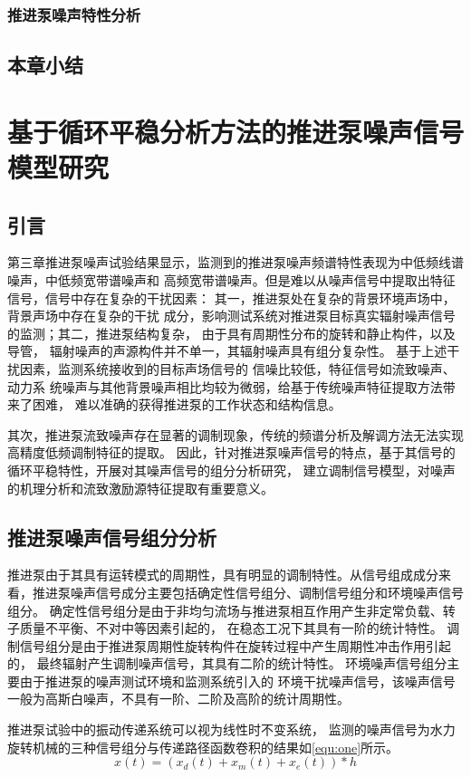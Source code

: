 \subsection{推进泵噪声特性分析}

\section{本章小结}
\chapter{基于循环平稳分析方法的推进泵噪声信号模型研究}
\section{引言}
第三章推进泵噪声试验结果显示，监测到的推进泵噪声频谱特性表现为中低频线谱噪声，中低频宽带谱噪声和
高频宽带谱噪声。但是难以从噪声信号中提取出特征信号，信号中存在复杂的干扰因素：
其一，推进泵处在复杂的背景环境声场中，背景声场中存在复杂的干扰
成分，影响测试系统对推进泵目标真实辐射噪声信号的监测；其二，推进泵结构复杂，
由于具有周期性分布的旋转和静止构件，以及导管，
辐射噪声的声源构件并不单一，其辐射噪声具有组分复杂性。
基于上述干扰因素，监测系统接收到的目标声场信号的
信噪比较低，特征信号如流致噪声、动力系
统噪声与其他背景噪声相比均较为微弱，给基于传统噪声特征提取方法带来了困难，
难以准确的获得推进泵的工作状态和结构信息。

其次，推进泵流致噪声存在显著的调制现象，传统的频谱分析及解调方法无法实现高精度低频调制特征的提取。
因此，针对推进泵噪声信号的特点，基于其信号的循环平稳特性，开展对其噪声信号的组分分析研究，
建立调制信号模型，对噪声的机理分析和流致激励源特征提取有重要意义。
\section{推进泵噪声信号组分分析}
推进泵由于其具有运转模式的周期性，具有明显的调制特性。从信号组成成分来看，推进泵噪声信号成分主要包括确定性信号组分、调制信号组分和环境噪声信号组分。
确定性信号组分是由于非均匀流场与推进泵相互作用产生非定常负载、转子质量不平衡、不对中等因素引起的，
在稳态工况下其具有一阶的统计特性。
调制信号组分是由于推进泵周期性旋转构件在旋转过程中产生周期性冲击作用引起的，
最终辐射产生调制噪声信号，其具有二阶的统计特性。
环境噪声信号组分主要由于推进泵的噪声测试环境和监测系统引入的
环境干扰噪声信号，该噪声信号一般为高斯白噪声，不具有一阶、二阶及高阶的统计周期性。

推进泵试验中的振动传递系统可以视为线性时不变系统，
监测的噪声信号为水力旋转机械的三种信号组分与传递路径函数卷积的结果如\autoref{equ:one}所示。 
\begin{equation}
    \label{equ:component}
    x\left ( t \right ) =\left ( x_d\left ( t \right )+x_m\left ( t \right )+x_e\left ( t \right ) \right )\ast h 
\end{equation}

